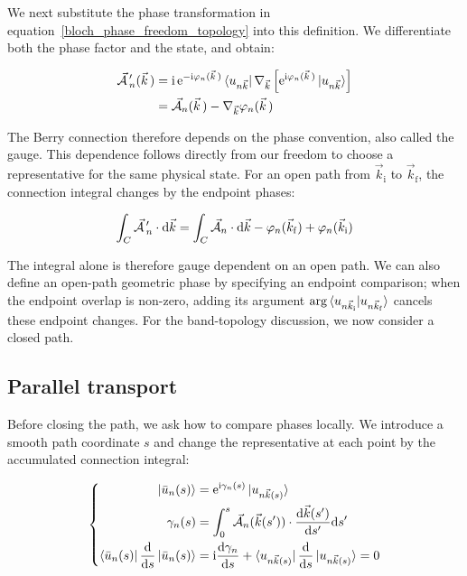 We next substitute the phase transformation in equation~\eqref{bloch_phase_freedom_topology} into this definition.
We differentiate both the phase factor and the state, and obtain:

\begin{equation}
\begin{aligned}
    \vec{\mathcal{A}}\,'_n(\vec{k}\,)
    &=\mathrm{i}\,\mathrm{e}^{-\mathrm{i}\varphi_n(\vec{k}\,)}
    \bra{u_{n\vec{k}}}\nabla_{\vec{k}}
    \left[\mathrm{e}^{\mathrm{i}\varphi_n(\vec{k}\,)}\ket{u_{n\vec{k}}}\right] \\
    &=\vec{\mathcal{A}}_n(\vec{k}\,)-\nabla_{\vec{k}}\varphi_n(\vec{k}\,)
\end{aligned}
\label{berry_connection_gauge_transformation_topology}
\end{equation}

The Berry connection therefore depends on the phase convention, also called the gauge.
This dependence follows directly from our freedom to choose a representative for the same physical state.
For an open path from $\vec{k}_\mathrm{i}$ to $\vec{k}_\mathrm{f}$, the connection integral changes by the endpoint phases:

\begin{equation}
    \int_C\vec{\mathcal{A}}\,'_n\cdot\mathrm{d}\vec{k}
    =\int_C\vec{\mathcal{A}}_n\cdot\mathrm{d}\vec{k}
    -\varphi_n(\vec{k}_\mathrm{f})+\varphi_n(\vec{k}_\mathrm{i})
\label{open_path_gauge_endpoints_appendix}
\end{equation}

The integral alone is therefore gauge dependent on an open path.
We can also define an open-path geometric phase by specifying an endpoint comparison;
when the endpoint overlap is non-zero, adding its argument
$\arg\braket{u_{n\vec{k}_\mathrm{i}}|u_{n\vec{k}_\mathrm{f}}}$ cancels these endpoint changes.
For the band-topology discussion, we now consider a closed path.

\FloatBarrier
\subsection{Parallel transport}

Before closing the path, we ask how to compare phases locally.
We introduce a smooth path coordinate $s$ and change the representative at each point by the accumulated connection integral:

\begin{equation}
\left\{\begin{aligned}
    \ket{\bar{u}_n(s)}
    &=\mathrm{e}^{\mathrm{i}\gamma_n(s)}\ket{u_{n\vec{k}(s)}} \\
    \gamma_n(s)&=\int_0^s\vec{\mathcal{A}}_n(\vec{k}(s'))
    \cdot\frac{\mathrm{d}\vec{k}(s')}{\mathrm{d} s'}\mathrm{d} s' \\
    \bra{\bar{u}_n(s)}\frac{\mathrm{d}}{\mathrm{d} s}\ket{\bar{u}_n(s)}
    &=\mathrm{i}\frac{\mathrm{d}\gamma_n}{\mathrm{d} s}
    +\bra{u_{n\vec{k}(s)}}\frac{\mathrm{d}}{\mathrm{d} s}\ket{u_{n\vec{k}(s)}}=0
\end{aligned}\right.
\label{parallel_transport_berry_appendix}
\end{equation}


